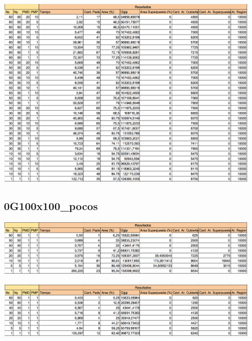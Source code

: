 \begin{center}
\includegraphics[width=1\textwidth]{imagenes/GML_0G100x100_muchos}
\end{center}


\subsection{0G100x100\_pocos}

\begin{center}
\includegraphics[width=1\textwidth]{imagenes/S_0G100x100_pocos}
\end{center}

\begin{center}
\includegraphics[width=1\textwidth]{imagenes/G_0G100x100_pocos}
\end{center}

